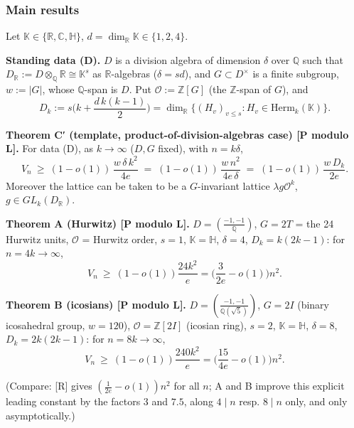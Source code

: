 \hypertarget{main-results}{%
\subsubsection*{Main results}\label{main-results}}

Let \(\mathbb K\in\{\mathbb R,\mathbb C,\mathbb H\}\), \(d=\dim_{\mathbb R}\mathbb K\in\{1,2,4\}\).

\textbf{Standing data (D).} \(D\) is a division algebra of dimension \(\delta\) over \(\mathbb Q\) such that \(D_{\mathbb R}:=D\otimes_{\mathbb Q}\mathbb R\cong\mathbb K^{s}\)
as \(\mathbb R\)-algebras (\(\delta=sd\)), and \(G\subset D^\times\) is a finite subgroup, \(w:=|G|\), whose \(\mathbb Q\)-span is \(D\).
Put \(\mathcal O:=\mathbb Z[G]\) (the \(\mathbb Z\)-span of \(G\)), and
\[D_k:=s\Big(k+\frac{d\,k(k-1)}2\Big)=\dim_{\mathbb R}\{(H_v)_{v\le s}:H_v\in \mathrm{Herm}_k(\mathbb K)\}.\]

\textbf{Theorem C′ (template, product-of-division-algebras case) {[}P modulo L{]}.} For data (D), as \(k\to\infty\) (\(D,G\) fixed), with \(n=k\delta\),
\[V_{n}\ \ge\ (1-o(1))\,\frac{w\,\delta\,k^2}{4e}\;=\;(1-o(1))\,\frac{w\,n^2}{4e\,\delta}\;=\;(1-o(1))\,\frac{w\,D_k}{2e}.\]
Moreover the lattice can be taken to be a \(G\)-invariant lattice \(\lambda g\mathcal O^k\), \(g\in GL_k(D_{\mathbb R})\).

\textbf{Theorem A (Hurwitz) {[}P modulo L{]}.} \(D=(\tfrac{-1,-1}{\mathbb Q})\), \(G=2T\) = the 24 Hurwitz units, \(\mathcal O\) = Hurwitz order, \(s=1\), \(\mathbb K=\mathbb H\),
\(\delta=4\), \(D_k=k(2k-1)\): for \(n=4k\to\infty\),
\[V_n\ \ge\ (1-o(1))\frac{24k^2}{e}=\Big(\frac{3}{2e}-o(1)\Big)n^2 .\]

\textbf{Theorem B (icosians) {[}P modulo L{]}.} \(D=(\tfrac{-1,-1}{\mathbb Q(\sqrt5)})\), \(G=2I\) (binary icosahedral group, \(w=120\)), \(\mathcal O=\mathbb Z[2I]\) (icosian ring),
\(s=2\), \(\mathbb K=\mathbb H\), \(\delta=8\), \(D_k=2k(2k-1)\): for \(n=8k\to\infty\),
\[V_n\ \ge\ (1-o(1))\frac{240k^2}{e}=\Big(\frac{15}{4e}-o(1)\Big)n^2 .\]

(Compare: {[}R{]} gives \((\frac1{2e}-o(1))n^2\) for all \(n\); A and B improve this explicit leading constant by the factors \(3\) and \(7.5\), along \(4\mid n\) resp. \(8\mid n\) only, and only asymptotically.)

